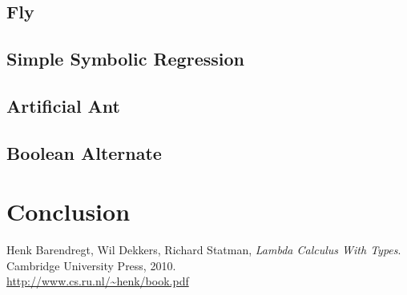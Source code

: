 \documentclass[12pt,a4paper]{report}
\begin{document}
		\section{Fly}
		\section{Simple Symbolic Regression}
		\section{Artificial Ant}
		\section{Boolean Alternate}
	

\chapter*{Conclusion}
	

\begin{thebibliography}{9}

  Henk Barendregt, Wil Dekkers, Richard Statman,
  \emph{Lambda Calculus With Types}.
  Cambridge University Press,
  2010. \\
  \url{http://www.cs.ru.nl/~henk/book.pdf}

\end{thebibliography}

	
	
\end{document}

